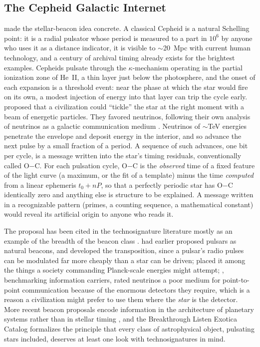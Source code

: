 \documentclass[final,5p]{elsarticle}
\newcommand{\oc}{O$-$C}
\begin{document}
\subsection{The Cepheid Galactic Internet}
\label{sec:learned}

\citet{Learned2008} made the stellar-beacon idea concrete. A classical Cepheid is a natural Schelling point: it is a radial pulsator whose period is measured to a part in $10^{6}$ by anyone who uses it as a distance indicator, it is visible to $\sim$20~Mpc with current human technology, and a century of archival timing already exists for the brightest examples. Cepheids pulsate through the $\kappa$-mechanism operating in the partial ionization zone of He~II, a thin layer just below the photosphere, and the onset of each expansion is a threshold event: near the phase at which the star would fire on its own, a modest injection of energy into that layer can trip the cycle early. \citet{Learned2008} proposed that a civilization could ``tickle'' the star at the right moment with a beam of energetic particles. They favored neutrinos, following their own analysis of neutrinos as a galactic communication medium \citep{Learned2009}. Neutrinos of $\sim$TeV energies penetrate the envelope and deposit energy in the interior, and so advance the next pulse by a small fraction of a period. A sequence of such advances, one bit per cycle, is a message written into the star's timing residuals, conventionally called \oc{}. For each pulsation cycle, \oc{} is the \emph{observed} time of a fixed feature of the light curve (a maximum, or the fit of a template) minus the time \emph{computed} from a linear ephemeris $t_0 + nP$, so that a perfectly periodic star has \oc{} identically zero and anything else is structure to be explained. A message written in a recognizable pattern (primes, a counting sequence, a mathematical constant) would reveal its artificial origin to anyone who reads it.

The proposal has been cited in the technosignature literature mostly as an example of the breadth of the beacon class \citep{Wright2018taxonomy, Hippke2018carriers}. \citet{Edmondson2003} had earlier proposed pulsars as natural beacons, and \citet{Chennamangalam2015} developed the transposition, since a pulsar's radio pulses can be modulated far more cheaply than a star can be driven; \citet{Lacki2015} placed it among the things a society commanding Planck-scale energies might attempt; \citet{Hippke2018carriers}, benchmarking information carriers, rated neutrinos a poor medium for point-to-point communication because of the enormous detectors they require, which is a reason a civilization might prefer to use them where the \emph{star} is the detector. More recent beacon proposals encode information in the architecture of planetary systems rather than in stellar timing \citep{Clement2022, Raymond2023}, and the Breakthrough Listen Exotica Catalog \citep{Lacki2021} formalizes the principle that every class of astrophysical object, pulsating stars included, deserves at least one look with technosignatures in mind.
\end{document}
